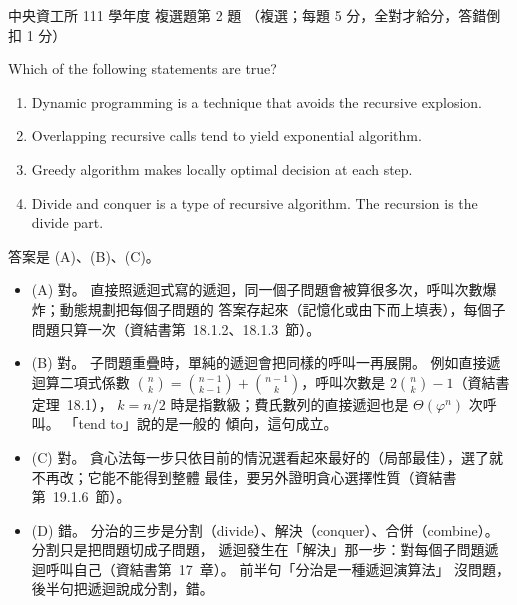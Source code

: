 \begin{pastexam}[label={px:ncu-111-dsa-02}]{中央資工所 111 學年度 複選題第 2 題}
（複選；每題 5 分，全對才給分，答錯倒扣 1 分）

Which of the following statements are true?
\begin{enumerate}[label=(\Alph*)]
\item Dynamic programming is a technique that avoids the recursive explosion.
\item Overlapping recursive calls tend to yield exponential algorithm.
\item Greedy algorithm makes locally optimal decision at each step.
\item Divide and conquer is a type of recursive algorithm. The recursion is the divide part.
\end{enumerate}
\end{pastexam}

\begin{pastsoln}
答案是 (A)、(B)、(C)。
\begin{itemize}
\item (A) 對。 直接照遞迴式寫的遞迴，同一個子問題會被算很多次，呼叫次數爆炸；動態規劃把每個子問題的
答案存起來（記憶化或由下而上填表），每個子問題只算一次（資結書第~18.1.2、18.1.3~節）。
\item (B) 對。 子問題重疊時，單純的遞迴會把同樣的呼叫一再展開。 例如直接遞迴算二項式係數
$\binom{n}{k} = \binom{n-1}{k-1} + \binom{n-1}{k}$，呼叫次數是 $2\binom{n}{k} - 1$（資結書定理~18.1），
$k = n/2$ 時是指數級；費氏數列的直接遞迴也是 $\Theta(\varphi^n)$ 次呼叫。 「tend to」說的是一般的
傾向，這句成立。
\item (C) 對。 貪心法每一步只依目前的情況選看起來最好的（局部最佳），選了就不再改；它能不能得到整體
最佳，要另外證明貪心選擇性質（資結書第~19.1.6~節）。
\item (D) 錯。 分治的三步是分割（divide）、解決（conquer）、合併（combine）。 分割只是把問題切成子問題，
遞迴發生在「解決」那一步：對每個子問題遞迴呼叫自己（資結書第~17~章）。 前半句「分治是一種遞迴演算法」
沒問題，後半句把遞迴說成分割，錯。
\end{itemize}
\end{pastsoln}
